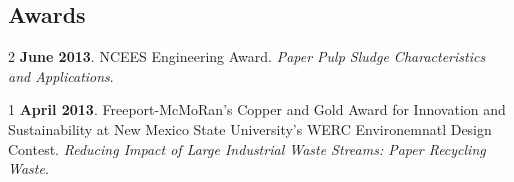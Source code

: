 \documentclass[margin,line]{resume}
\begin{document}
\begin{resume}
	\section{\mysidestyle Awards}
	\begin{footnotesize}
	\begin{list1}
	\item[2] {\bf June 2013}. NCEES Engineering Award. {\sl Paper Pulp Sludge Characteristics and Applications}.\\
	\item[1] {\bf April 2013}. Freeport-McMoRan's Copper and Gold Award for Innovation and Sustainability at New Mexico State University's WERC Environemnatl Design Contest. {\sl Reducing Impact of Large Industrial Waste Streams: Paper Recycling Waste}. \\
 	\end{list1}
 \end{footnotesize}

\end{resume}
\end{document}
